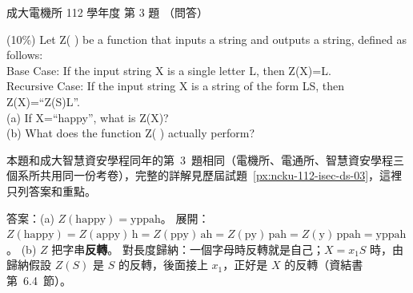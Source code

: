 \begin{pastexam}[label={px:ncku-112-ee-ds-03}]{成大電機所 112 學年度 第 3 題}
（問答）

(10\%) Let Z( ) be a function that inputs a string and outputs a string, defined as follows:\\
\hspace*{2em}Base Case: If the input string X is a single letter L, then Z(X)=L.\\
\hspace*{2em}Recursive Case: If the input string X is a string of the form LS, then Z(X)=``Z(S)L''.\\
\hspace*{2em}(a) If X=``happy'', what is Z(X)?\\
\hspace*{2em}(b) What does the function Z( ) actually perform?
\end{pastexam}

\begin{pastsoln}
本題和成大智慧資安學程同年的第~3~題相同（電機所、電通所、智慧資安學程三個系所共用同一份考卷），完整的詳解見歷屆試題~\ref{px:ncku-112-isec-ds-03}，這裡只列答案和重點。

答案：(a) $Z(\text{happy}) = \text{yppah}$。 展開：$Z(\text{happy}) = Z(\text{appy})\,\text{h}
= Z(\text{ppy})\,\text{ah} = Z(\text{py})\,\text{pah} = Z(\text{y})\,\text{ppah} = \text{yppah}$。
(b) $Z$ 把字串\textbf{反轉}。 對長度歸納：一個字母時反轉就是自己；$X = x_1 S$ 時，由歸納假設 $Z(S)$
是 $S$ 的反轉，後面接上 $x_1$，正好是 $X$ 的反轉（資結書第~6.4~節）。
\end{pastsoln}

